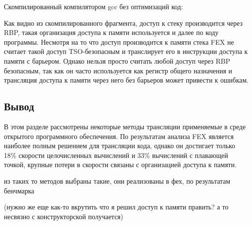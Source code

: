 Скомпилированный компилятором gcc без оптимизаций код:


Как видно из скомпилированного фрагмента, доступ к стеку производится через RBP, такая организация доступа к памяти используется и далее по коду программы. Несмотря на то что доступ производится к памяти стека FEX не считает такой доступ TSO-безопасным и транслирует его в инструкции доступа к памяти с барьером. Однако нельзя просто считать любой доступ через RBP безопасным, так как он часто используется как регистр общего назначения и трансляция доступа к памяти через него без барьеров может привести к ошибкам.

\subsection{Вывод}

В этом разделе рассмотрены некоторые методы трансляции применяемые в среде открытого программного обеспечения. По результатам анализа FEX является наиболее полным решением для трансляции кода, однако он достигает только 18\% скорости целочисленных вычислений и 33\% вычислений с плавающей точкой, крупные потери в скорости связаны с организацией доступа к памяти.

из таких то методов выбраны такие, они реализованы в фех, по результатам бенчмарка 

(нужно же еще как-то вкрутить что я решил доступ к памяти править? а то несвязно с конструкторской получается)

